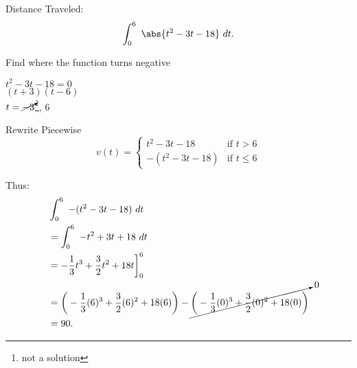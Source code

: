 \documentclass{report}
\begin{document}
    Distance Traveled:
    \begin{align*}
        \int_{0}^{6}\ \abs{t^{2}-3t-18}\ dt
    .\end{align*}
    \bigbreak \noindent 
    
    Find where the function turns negative
    \begin{center}
        
        $t^{2} - 3t-18 = 0$ \\
        $(t+3)(t-6)$ \\
        $t = \cancelto{}{-3}$\footnote{not a solution}, 6
    \end{center}
    \bigbreak \noindent 
    
    Rewrite Piecewise
       \begin{equation}
        v(t)=
            \begin{cases}
                t^{2}-3t-18& \text{if } t > 6 \\
                 -(t^{2}-3t-18)& \text{if } t \leq 6 
            \end{cases}
        \end{equation}

        \pagebreak \bigbreak \noindent 
        Thus:
        \begin{align*}
            &\int_{0}^{6}\ -(t^{2}-3t-18)\ dt \\
            &=\int_{0}^{6}\ -t^{2}+3t+18\ dt \\
            &= -\frac{1}{3}t^{3}+\frac{3}{2}t^{2}+18t\bigg]^{6}_0 \\
            &= \bigg(-\frac{1}{3}(6)^{3}+\frac{3}{2}(6)^{2}+18(6)\bigg) - \cancelto{0}{\bigg(-\frac{1}{3}(0)^{3}+\frac{3}{2}(0)^{2}+18(0)\bigg)} \\
            &= 90
        .\end{align*}


    



    
    

    
    
\end{document}
